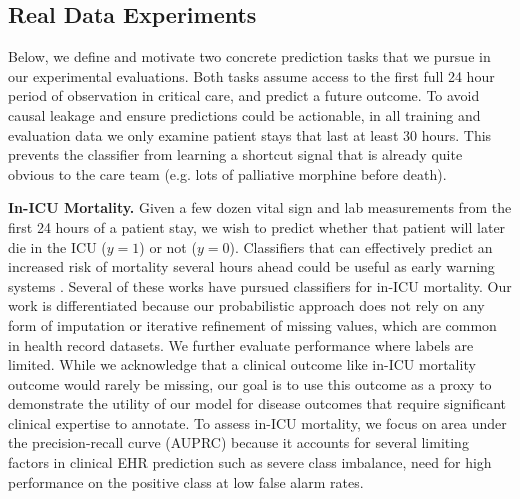 \subsection{Real Data Experiments}
Below, we define and motivate two concrete prediction tasks that we pursue in our experimental evaluations.
Both tasks assume access to the first full 24 hour period of observation in critical care, and predict a future outcome.
To avoid causal leakage and ensure predictions could be actionable, in all training and evaluation data we only examine patient stays that last at least 30 hours. This prevents the classifier from learning a shortcut signal that is already quite obvious to the care team (e.g. lots of palliative morphine before death).

\textbf{In-ICU Mortality.} 
Given a few dozen vital sign and lab measurements from the first 24 hours of a patient stay, we wish to predict whether that patient will later die in the ICU ($y=1$) or not ($y=0$). 
Classifiers that can effectively predict an increased risk of mortality several hours ahead could be useful as early warning systems \citep{purushothamBenchmarkingDeepLearning2018, harutyunyanMultitaskLearningBenchmarking2019a, gao2020machine, rajkomar2018scalable}. 
Several of these works have pursued classifiers for in-ICU mortality. Our work is differentiated because our probabilistic approach does not rely on any form of imputation or iterative refinement of missing values, which are common in health record datasets. We further evaluate performance where labels are limited. While we acknowledge that a clinical outcome like in-ICU mortality outcome would rarely be missing, our goal is to use this outcome as a proxy to demonstrate the utility of our model for disease outcomes that require significant clinical expertise to annotate. To assess in-ICU mortality, we focus on area under the precision-recall curve (AUPRC) because it accounts for several limiting factors in clinical EHR prediction such as severe class imbalance, need for high performance on the positive class at low false alarm rates.

